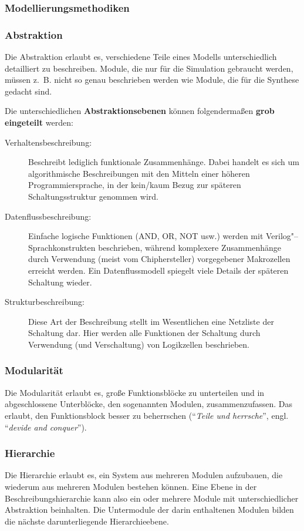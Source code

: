 \subsubsection{Modellierungsmethodiken}
\subsubsection*{Abstraktion}

Die Abstraktion erlaubt es, verschiedene Teile eines Modells
unterschiedlich detailliert zu beschreiben. Module, die nur für
die Simulation gebraucht werden, müssen z.~B. nicht so genau
beschrieben werden wie Module, die für die Synthese gedacht sind.

\noindent Die unterschiedlichen \textbf{Abstraktionsebenen} können folgendermaßen \textbf{grob eingeteilt} werden:
\begin{description}
	\item[Verhaltensbeschreibung:] Beschreibt lediglich funktionale Zusammenhänge. Dabei handelt es sich um algorithmische Beschreibungen mit den Mitteln einer höheren Programmiersprache,
	in der kein/kaum Bezug zur späteren Schaltungsstruktur genommen wird.
	
	\item[Datenflussbeschreibung:] Einfache logische Funktionen (AND, OR,
	NOT usw.) werden mit Verilog"--Sprachkonstrukten beschrieben,
	während komplexere Zusammenhänge durch Verwendung (meist vom
	Chiphersteller) vorgegebener Makrozellen erreicht werden. Ein Datenflussmodell
spiegelt viele Details der späteren Schaltung wieder.
	
	\item[Strukturbeschreibung:] Diese Art der Beschreibung stellt im
	Wesentlichen eine Netzliste der Schaltung dar. Hier werden alle
	Funktionen der Schaltung durch Verwendung (und Verschaltung) von
	Logikzellen beschrieben.
\end{description}

\subsubsection*{Modularität}
Die Modularität erlaubt es, große Funktionsblöcke zu unterteilen
und in abgeschlossene Unterblöcke, den sogenannten Modulen,
zusammenzufassen. Das erlaubt, den Funktionsblock besser zu
beherrschen ("`\textit{Teile und herrsche}"', engl. "`\textit{devide and conquer}"').



\subsubsection*{Hierarchie}
Die Hierarchie erlaubt es, ein System aus mehreren Modulen aufzubauen, die
wiederum aus mehreren Modulen bestehen können. Eine
Ebene in der Beschreibungshierarchie kann also ein oder mehrere
Module mit unterschiedlicher Abstraktion beinhalten. Die
Untermodule der darin enthaltenen Modulen bilden die nächste
darunterliegende Hierarchieebene.


